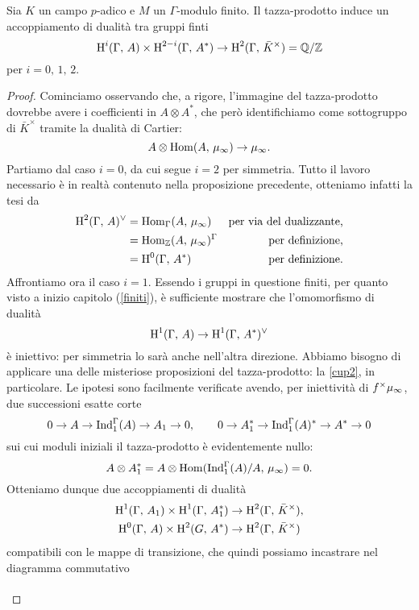\begin{theorem}
	Sia $ K $ un campo $ p $-adico e $ M $ un $ \Gamma $-modulo finito. Il tazza-prodotto induce un accoppiamento di dualità tra gruppi finti
	\[ \operatorname{H}^i(\Gamma, \, A) \times \operatorname{H}^{2-i}(\Gamma, \, A^*) \to \operatorname{H}^2(\Gamma, \, \bar{K}^\times) = \mathbb{Q} / \mathbb{Z} \]
	per $ i = 0, \, 1, \, 2 $.
\end{theorem}
\begin{proof}
	Cominciamo osservando che, a rigore, l'immagine del tazza-prodotto dovrebbe avere i coefficienti in $ A \otimes A^* $, che però identifichiamo come sottogruppo di $ \bar{K}^\times $ tramite la dualità di Cartier:
	\[ A \otimes \operatorname{Hom}(A,\, \mu_\infty) \to \mu_\infty. \]
	Partiamo dal caso $ i = 0 $, da cui segue $ i = 2 $ per simmetria. Tutto il lavoro necessario è in realtà contenuto nella proposizione precedente, otteniamo infatti la tesi da
	\begin{align*}
		\operatorname{H}^2(\Gamma, \, A)^\vee & = \operatorname{Hom}_\Gamma(A, \, \mu_\infty) & \text{per via del dualizzante,} \\
		& = \operatorname{Hom}_{\mathbb{Z}}(A, \, \mu_\infty)^\Gamma & \text{per definizione,} \\
		& = \operatorname{H}^0(\Gamma, \, A^*) & \text{per definizione.}
	\end{align*}
	Affrontiamo ora il caso $ i = 1 $. Essendo i gruppi in questione finiti, per quanto visto a inizio capitolo (\ref{finiti}), è sufficiente mostrare che l'omomorfismo di dualità
	\[ \operatorname{H}^1(\Gamma, \, A) \to \operatorname{H}^1(\Gamma, \, A^*)^\vee \]
	è iniettivo: per simmetria lo sarà anche nell'altra direzione. Abbiamo bisogno di applicare una delle misteriose proposizioni del tazza-prodotto: la \ref{cup2}, in particolare. Le ipotesi sono facilmente verificate avendo, per iniettività di $ f^\times\mu_\infty $, due successioni esatte corte
	\[ 0 \to A \to \operatorname{Ind}_1^\Gamma(A) \to A_1 \to 0, \qquad 0 \to A_1^* \to \operatorname{Ind}_1^\Gamma(A)^* \to A^* \to 0 \]
	sui cui moduli iniziali il tazza-prodotto è evidentemente nullo:
	\[ A \otimes A_1^* = A \otimes \operatorname{Hom}(\operatorname{Ind}_1^\Gamma(A)/A, \, \mu_\infty) = 0. \]
	Otteniamo dunque due accoppiamenti di dualità 
	\begin{align*}
		\operatorname{H}^{1}(\Gamma, \, A_1) \times \operatorname{H}^{1}(\Gamma, \, A_1^*) &\to \operatorname{H}^{2}(\Gamma, \, \bar{K}^\times),\\
		\operatorname{H}^{0}(\Gamma, \, A) \times \operatorname{H}^{2}(G, \, A^*) &\to \operatorname{H}^{2}(\Gamma, \, \bar{K}^\times)
	\end{align*}
	compatibili con le mappe di transizione, che quindi possiamo incastrare nel diagramma commutativo
	\[\begin{tikzcd}[column sep = small]

\end{tikzcd}\]
\end{proof}
